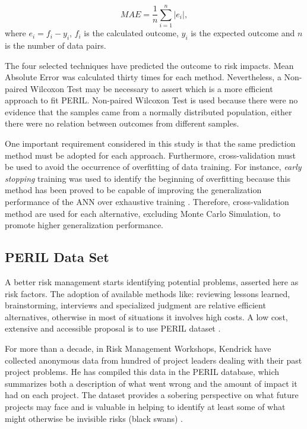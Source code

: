 \documentclass[a4paper,twoside]{article}
\begin{document}
\begin{equation}\label{eq_MAE}
    MAE=\frac{1}{n}\sum_{i=1}^{n} |e_i|,
\end{equation}
where $e_i=f_i - y_i$, $f_i$ is the calculated outcome, $y_i$ is the expected outcome and $n$ is the number of data pairs.

The four selected techniques have predicted the outcome to risk impacts. Mean Absolute Error was calculated thirty times for each method. Nevertheless, a Non-paired Wilcoxon Test \cite{siegel1956nonparametric} may be necessary to assert which is a more efficient approach to fit PERIL. Non-paired Wilcoxon Test is used because there were no evidence that the samples came from a normally distributed population, either there were no relation between outcomes from different samples.

One important requirement considered in this study is that the same prediction method must be adopted for each approach. Furthermore, cross-validation \cite{amari1996statistical} must be used to avoid the occurrence of overfitting of data training. For instance, \textit{early stopping} training was used to identify the beginning of overfitting because this method has been proved to be capable of improving the generalization performance of the ANN over exhaustive training \cite{haykin1994neural} \cite{amari1996new}. Therefore, cross-validation method are used for each alternative, excluding Monte Carlo Simulation, to promote higher generalization performance.

\subsection{PERIL Data Set}
\label{sec:perildataset}

\noindent A better risk management starts identifying potential problems, asserted here as risk factors. The adoption of available methods like: reviewing lessons learned, brainstorming, interviews and specialized judgment are relative efficient alternatives, otherwise in most of situations it involves high costs. A low cost, extensive and accessible proposal is to use PERIL dataset \cite{kendrick2003identifying}.

For more than a decade, in Risk Management Workshops, Kendrick have collected anonymous data from hundred of project leaders dealing with their past project problems. He has compiled this data in the PERIL database, which summarizes both a description of what went wrong and the amount of impact it had on each project. The dataset provides a sobering perspective on what future projects may face and is valuable in helping to identify at least some of what might otherwise be invisible risks (black swans) \cite{kendrick2003identifying}.
\end{document}
